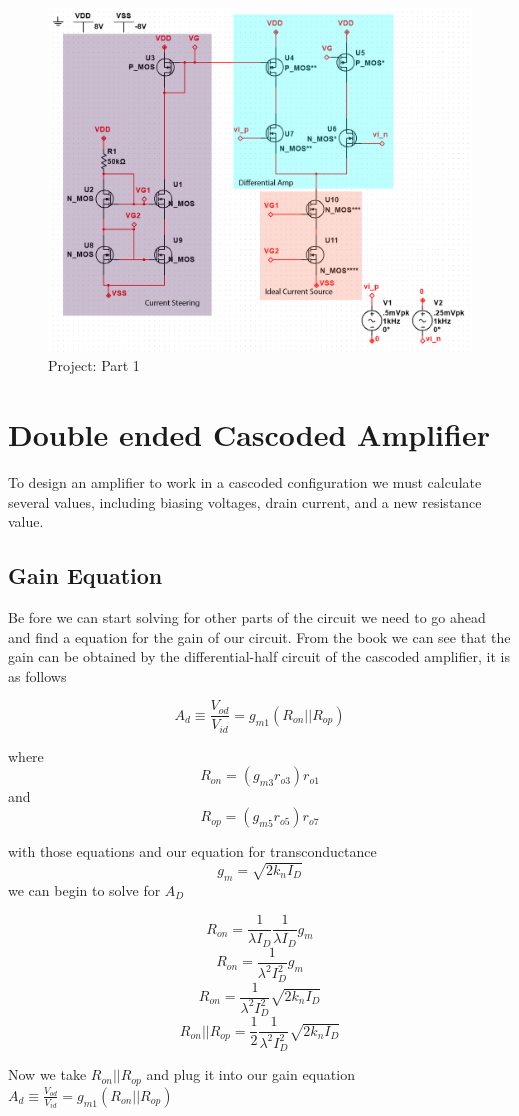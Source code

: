 \documentclass[12pt]{article}
\begin{document}
	
	\begin{figure}[h!]
		\label{fig:amp}
		\caption{Project: Part 1}
		\centering
		\includegraphics[width=.6\textwidth]{photoshop}
	\end{figure}
	
	
	
	
	\section{Double ended Cascoded Amplifier}
	To design an amplifier to work in a cascoded configuration we must calculate several values, including biasing voltages, drain current, and a new resistance value.
	\subsection{Gain Equation}
	Be fore we can start solving for other parts of the circuit we need to go ahead and find a equation for the gain of our circuit. From the book we can see that the gain can be obtained by the differential-half circuit of the cascoded amplifier, it is as follows
	
	$$A_d \equiv \frac{V_{od}}{V_{id}} = g_{m1} (R_{on}|| R_{op})$$
	
	where
	$$R_{on} = (g_{m3} r_{o3}) r_{o1}$$ 
	and 
	$$R_{op} = (g_{m5} r_{o5}) r_{o7}$$
	
	with those equations and our equation for transconductance 
	$$g_{m} = \sqrt{2 k_n I_D}$$
	we can begin to solve for $A_D$
	
	$$R_{on} =\frac{1}{\lambda I_D} \frac{1}{\lambda I_D} g_m$$
	$$R_{on} = \frac{1}{\lambda^2 I_D^2} g_m$$
	$$R_{on} = \frac{1}{\lambda^2 I_D^2} \sqrt{2 k_n I_D}$$
	$$R_{on}|| R_{op} = \frac{1}{2} \frac{1}{\lambda^2 I_D^2} \sqrt{2 k_n I_D}  $$
	
	Now we take $R_{on}|| R_{op}$ and plug it into our gain equation $A_d \equiv \frac{V_{od}}{V_{id}} = g_{m1} (R_{on}|| R_{op})$
	
\end{document}
